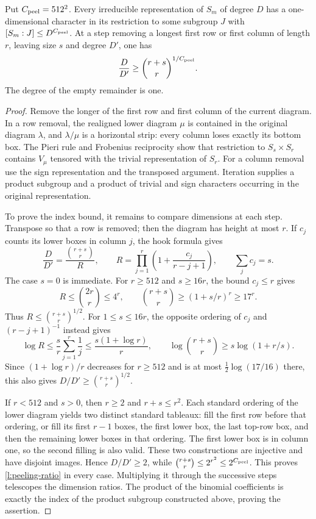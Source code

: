 \begin{lemma}
\label{l:peeling-character}
Put $C_{\rm peel}=512^2$.  Every irreducible representation of $S_m$
of degree $D$ has a one-dimensional character in its restriction to
some subgroup $J$ with $[S_m:J]\le D^{C_{\rm peel}}$.
At a step removing a longest first row or first column of length $r$,
leaving size $s$ and degree $D'$, one has
\begin{equation}\label{l:peeling-ratio}
 \frac D{D'}\ge\binom{r+s}r^{1/C_{\rm peel}}.
\end{equation}
The degree of the empty remainder is one.
\end{lemma}
\begin{proof}
Remove the longer of the first row and first column of the current
diagram.  In a row removal, the realigned lower diagram $\mu$ is
contained in the original diagram $\lambda$, and $\lambda/\mu$
is a horizontal strip: every column loses exactly its bottom box.
The Pieri rule and Frobenius reciprocity show that restriction to
$S_s\times S_r$ contains $V_\mu$ tensored with the trivial
representation of $S_r$.  For a column removal use the sign
representation and the transposed argument.  Iteration supplies a
product subgroup and a product of trivial and sign characters
occurring in the original representation.

To prove the index bound, it remains to compare dimensions at each
step.  Transpose so that a row is removed; then the diagram has height
at most $r$.  If $c_j$ counts its lower boxes in column $j$, the
hook formula gives
\[
 \frac D{D'}=\frac{\binom{r+s}r}{R},\qquad
 R=\prod_{j=1}^r\left(1+\frac{c_j}{r-j+1}\right),
 \qquad \sum_jc_j=s.
\]
The case $s=0$ is immediate.  For $r\ge512$ and $s\ge16r$,
the bound $c_j\le r$ gives
\[
 R\le\binom{2r}r\le4^r,
 \qquad \binom{r+s}r\ge(1+s/r)^r\ge17^r.
\]
Thus $R\le\binom{r+s}r^{1/2}$.  For $1\le s\le16r$,
the opposite ordering of $c_j$ and $(r-j+1)^{-1}$ instead gives
\[
 \log R\le\frac sr\sum_{j=1}^r\frac1j
       \le\frac{s(1+\log r)}r,
 \qquad \log\binom{r+s}r\ge s\log(1+r/s).
\]
Since $(1+\log r)/r$ decreases for $r\ge512$ and is at most
$\frac12\log(17/16)$ there, this also gives
$D/D'\ge\binom{r+s}r^{1/2}$.

If $r<512$ and $s>0$, then $r\ge2$ and $r+s\le r^2$.
Each standard ordering of the lower diagram yields two distinct
standard tableaux: fill the first row before that ordering, or fill
its first $r-1$ boxes, the first lower box, the last top-row box,
and then the remaining lower boxes in that ordering.  The first lower
box is in column one, so the second filling is also valid.  These
two constructions are injective and have disjoint images.  Hence
$D/D'\ge2$, while
$\binom{r+s}r\le2^{r^2}\le2^{C_{\rm peel}}$.
This proves \eqref{l:peeling-ratio} in every case.  Multiplying it
through the successive steps telescopes the dimension ratios.  The
product of the binomial coefficients is exactly the index of the
product subgroup constructed above, proving the assertion.
\end{proof}

